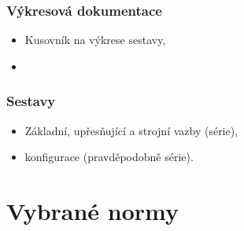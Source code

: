 \subsection*{Výkresová dokumentace}
\begin{itemize}
    \setlength\itemsep{0.05em}
    \item Kusovník na výkrese sestavy,
    \item 
\end{itemize}

\subsection*{Sestavy}
\begin{itemize}
    \setlength\itemsep{0.05em}
    \item Základní, upřesňující a strojní vazby (série),
    \item konfigurace (pravděpodobně série).
\end{itemize}



\chapter{Vybrané normy}

